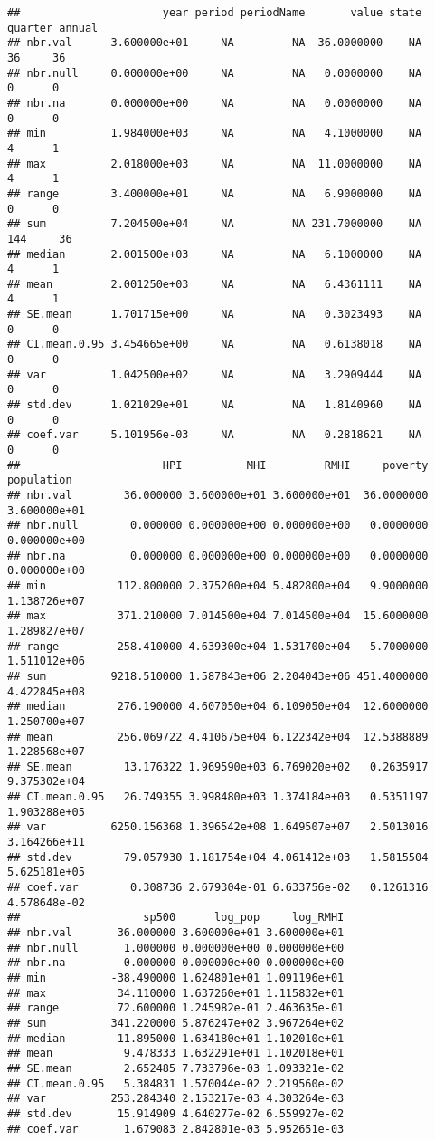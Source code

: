 \documentclass[
]{article}
\begin{document}
\begin{verbatim}
##                      year period periodName       value state quarter annual
## nbr.val      3.600000e+01     NA         NA  36.0000000    NA      36     36
## nbr.null     0.000000e+00     NA         NA   0.0000000    NA       0      0
## nbr.na       0.000000e+00     NA         NA   0.0000000    NA       0      0
## min          1.984000e+03     NA         NA   4.1000000    NA       4      1
## max          2.018000e+03     NA         NA  11.0000000    NA       4      1
## range        3.400000e+01     NA         NA   6.9000000    NA       0      0
## sum          7.204500e+04     NA         NA 231.7000000    NA     144     36
## median       2.001500e+03     NA         NA   6.1000000    NA       4      1
## mean         2.001250e+03     NA         NA   6.4361111    NA       4      1
## SE.mean      1.701715e+00     NA         NA   0.3023493    NA       0      0
## CI.mean.0.95 3.454665e+00     NA         NA   0.6138018    NA       0      0
## var          1.042500e+02     NA         NA   3.2909444    NA       0      0
## std.dev      1.021029e+01     NA         NA   1.8140960    NA       0      0
## coef.var     5.101956e-03     NA         NA   0.2818621    NA       0      0
##                      HPI          MHI         RMHI     poverty   population
## nbr.val        36.000000 3.600000e+01 3.600000e+01  36.0000000 3.600000e+01
## nbr.null        0.000000 0.000000e+00 0.000000e+00   0.0000000 0.000000e+00
## nbr.na          0.000000 0.000000e+00 0.000000e+00   0.0000000 0.000000e+00
## min           112.800000 2.375200e+04 5.482800e+04   9.9000000 1.138726e+07
## max           371.210000 7.014500e+04 7.014500e+04  15.6000000 1.289827e+07
## range         258.410000 4.639300e+04 1.531700e+04   5.7000000 1.511012e+06
## sum          9218.510000 1.587843e+06 2.204043e+06 451.4000000 4.422845e+08
## median        276.190000 4.607050e+04 6.109050e+04  12.6000000 1.250700e+07
## mean          256.069722 4.410675e+04 6.122342e+04  12.5388889 1.228568e+07
## SE.mean        13.176322 1.969590e+03 6.769020e+02   0.2635917 9.375302e+04
## CI.mean.0.95   26.749355 3.998480e+03 1.374184e+03   0.5351197 1.903288e+05
## var          6250.156368 1.396542e+08 1.649507e+07   2.5013016 3.164266e+11
## std.dev        79.057930 1.181754e+04 4.061412e+03   1.5815504 5.625181e+05
## coef.var        0.308736 2.679304e-01 6.633756e-02   0.1261316 4.578648e-02
##                   sp500      log_pop     log_RMHI
## nbr.val       36.000000 3.600000e+01 3.600000e+01
## nbr.null       1.000000 0.000000e+00 0.000000e+00
## nbr.na         0.000000 0.000000e+00 0.000000e+00
## min          -38.490000 1.624801e+01 1.091196e+01
## max           34.110000 1.637260e+01 1.115832e+01
## range         72.600000 1.245982e-01 2.463635e-01
## sum          341.220000 5.876247e+02 3.967264e+02
## median        11.895000 1.634180e+01 1.102010e+01
## mean           9.478333 1.632291e+01 1.102018e+01
## SE.mean        2.652485 7.733796e-03 1.093321e-02
## CI.mean.0.95   5.384831 1.570044e-02 2.219560e-02
## var          253.284340 2.153217e-03 4.303264e-03
## std.dev       15.914909 4.640277e-02 6.559927e-02
## coef.var       1.679083 2.842801e-03 5.952651e-03
\end{verbatim}
\end{document}

